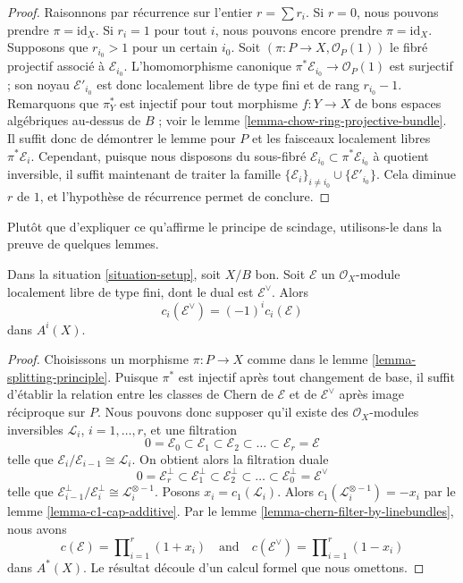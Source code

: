 \begin{proof}
Raisonnons par récurrence sur l'entier $r = \sum r_i$. Si $r = 0$, nous
pouvons prendre $\pi = \text{id}_X$. Si $r_i = 1$ pour tout $i$, nous pouvons
encore prendre $\pi = \text{id}_X$. Supposons que $r_{i_0} > 1$ pour un certain
$i_0$. Soit $(\pi : P \to X, \mathcal{O}_P(1))$ le fibré projectif associé à
$\mathcal{E}_{i_0}$. L'homomorphisme canonique $\pi^*\mathcal{E}_{i_0} \to
\mathcal{O}_P(1)$ est surjectif ; son noyau $\mathcal{E}'_{i_0}$ est donc
localement libre de type fini et de rang $r_{i_0} - 1$. Remarquons que
$\pi_Y^*$ est injectif pour tout morphisme $f : Y \to X$ de bons espaces
algébriques au-dessus de $B$ ; voir le lemme
\ref{lemma-chow-ring-projective-bundle}. Il suffit donc de démontrer le lemme
pour $P$ et les faisceaux localement libres $\pi^*\mathcal{E}_i$. Cependant,
puisque nous disposons du sous-fibré $\mathcal{E}_{i_0} \subset
\pi^*\mathcal{E}_{i_0}$ à quotient inversible, il suffit maintenant de traiter
la famille $\{\mathcal{E}_i\}_{i \not = i_0} \cup
\{\mathcal{E}'_{i_0}\}$. Cela diminue $r$ de $1$, et l'hypothèse de récurrence
permet de conclure.
\end{proof}

\noindent
Plutôt que d'expliquer ce qu'affirme le principe de scindage, utilisons-le
dans la preuve de quelques lemmes.

\begin{lemma}
\label{lemma-chern-classes-dual}
Dans la situation \ref{situation-setup}, soit $X/B$ bon. Soit $\mathcal{E}$ un
$\mathcal{O}_X$-module localement libre de type fini, dont le dual est
$\mathcal{E}^\vee$. Alors
$$
c_i(\mathcal{E}^\vee) = (-1)^i c_i(\mathcal{E})
$$
dans $A^i(X)$.
\end{lemma}

\begin{proof}
Choisissons un morphisme $\pi : P \to X$ comme dans le lemme
\ref{lemma-splitting-principle}. Puisque $\pi^*$ est injectif après tout
changement de base, il suffit d'établir la relation entre les classes de Chern
de $\mathcal{E}$ et de $\mathcal{E}^\vee$ après image réciproque sur $P$. Nous
pouvons donc supposer qu'il existe des $\mathcal{O}_X$-modules inversibles
${\mathcal L}_i$, $i = 1, \ldots, r$, et une filtration
$$
0 = \mathcal{E}_0 \subset \mathcal{E}_1 \subset \mathcal{E}_2
\subset \ldots \subset \mathcal{E}_r = \mathcal{E}
$$
telle que $\mathcal{E}_i/\mathcal{E}_{i - 1} \cong \mathcal{L}_i$. On obtient
alors la filtration duale
$$
0 = \mathcal{E}_r^\perp \subset \mathcal{E}_1^\perp \subset \mathcal{E}_2^\perp
\subset \ldots \subset \mathcal{E}_0^\perp = \mathcal{E}^\vee
$$
telle que $\mathcal{E}_{i - 1}^\perp/\mathcal{E}_i^\perp \cong
\mathcal{L}_i^{\otimes -1}$. Posons $x_i = c_1(\mathcal{L}_i)$. Alors
$c_1(\mathcal{L}_i^{\otimes -1}) = - x_i$ par le lemme
\ref{lemma-c1-cap-additive}. Par le lemme
\ref{lemma-chern-filter-by-linebundles}, nous avons
$$
c(\mathcal{E}) = \prod\nolimits_{i = 1}^r (1 + x_i)
\quad\text{and}\quad
c(\mathcal{E}^\vee) = \prod\nolimits_{i = 1}^r (1 - x_i)
$$
dans $A^*(X)$. Le résultat découle d'un calcul formel que nous omettons.
\end{proof}

